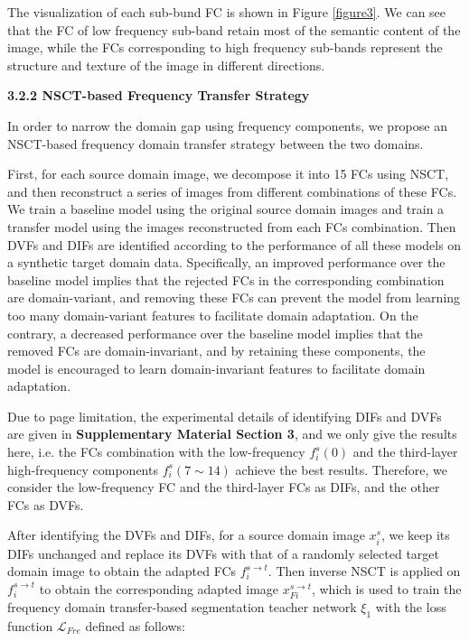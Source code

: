 \documentclass[letterpaper]{article} %
\begin{document}
The visualization of each sub-bund FC is shown in Figure \ref{figure3}. We can see that the FC of low frequency sub-band retain 
most of the semantic content of the image, while the FCs corresponding to high frequency sub-bands represent the 
structure and texture of the image in different directions.

\noindent \textbf{3.2.2 NSCT-based Frequency Transfer Strategy}

\noindent In order to narrow the domain gap using frequency components, we propose an NSCT-based frequency domain transfer 
strategy between the two domains.

First, for each source domain image, we decompose it into 15 FCs using NSCT, and then reconstruct a series of images 
from different combinations of these FCs. We train a baseline model using the original source domain images and train 
a transfer model using the images reconstructed from each FCs combination. Then DVFs and DIFs are identified according 
to the performance of all these models on a synthetic target domain data. Specifically, an improved performance over 
the baseline model implies that the rejected FCs in the corresponding combination are domain-variant, and removing 
these FCs can prevent the model from learning too many domain-variant features to facilitate domain adaptation. 
On the contrary, a decreased performance over the baseline model implies that the removed FCs 
are domain-invariant, and by retaining these components, the model is encouraged to learn domain-invariant features to 
facilitate domain adaptation.

Due to page limitation, the experimental details of identifying DIFs and DVFs are given in \textbf{Supplementary Material Section 3}, 
and we only give the results here, i.e. the FCs combination with the low-frequency $f_i^s (0)$ and the third-layer high-frequency 
components $f_i^s (7\sim 14)$ achieve the best results. Therefore, we consider the low-frequency FC and the third-layer FCs as DIFs, and 
the other FCs as DVFs.

After identifying the DVFs and DIFs, for a source domain image $x_i^s$, we keep its DIFs unchanged and replace its 
DVFs with that of a randomly selected target domain image to obtain the adapted FCs $f_{i}^{s\to{t}}$. Then inverse NSCT 
is applied on $f_{i}^{s\to{t}}$ to obtain the corresponding adapted image $x_{Fi}^{s\to{t}}$, which is used to train the frequency 
domain transfer-based segmentation teacher network $\xi_1$ with the loss function $ \mathcal{L}_{Fre}$  defined as follows:
\end{document}
